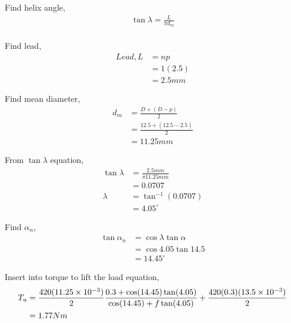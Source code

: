 \documentclass[a4paper, fleqn]{article}
\providecommand{\sci}[1]{\protect\ensuremath{\times 10^{\StrSubstitute[0]{#1}{e}{}}}}
\begin{document}
Find helix angle,
\begin{equation*}
    \begin{aligned}
    \tan\lambda = \frac{L}{\pi d_m}\\
    \end{aligned}
\end{equation*}

Find lead,
\begin{equation*}
    \begin{aligned}
    Lead, L &=np\\
    &=1(2.5)\\
    &=2.5mm    
    \end{aligned}
\end{equation*}

Find mean diameter,
\begin{equation*}
    \begin{aligned}
    d_m &= \frac {D+(D-p)}{2}\\  
    &= \frac {12.5+(12.5-2.5)}{2}\\ 
    &= 11.25mm
    \end{aligned}
\end{equation*}

From $\tan\lambda$ equation,
\begin{equation*}
    \begin{aligned}
    \tan\lambda &= \frac{2.5mm}{\pi 11.25mm} \\
    &=0.0707\\
    \lambda &= \tan^{-1}(0.0707)\\
    &=4.05^{\circ}
    \end{aligned}
\end{equation*}

Find $\alpha_n$,
\begin{equation*}
    \begin{aligned}
    \tan \alpha_n &= \cos \lambda \tan \alpha\\
     &= \cos 4.05 \tan 14.5\\
    &= 14.45^{\circ}
    \end{aligned} 
\end{equation*}

Insert into torque to lift the load equation,
\begin{equation*}
    \begin{aligned}
    T_u &= \frac{420(11.25\sci{e-3})}{2} \frac{0.3+\cos(14.45) \tan(4.05)}{\cos(14.45) + f\tan(4.05)} + \frac{420(0.3)(13.5\sci{e-3})}{2} \\
    &=1.77 Nm
    \end{aligned}
\end{equation*}
\end{document}
